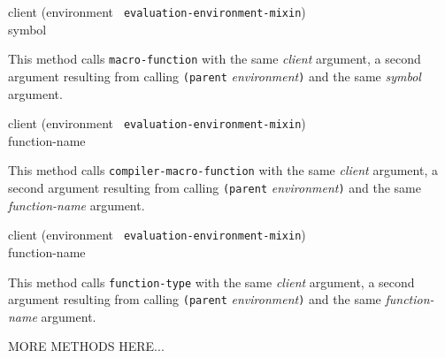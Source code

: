 {\small{} {client (environment {\tt
      evaluation-environment-mixin}) \\ symbol}
}

This method calls \texttt{macro-function} with the same
\textit{client} argument, a second argument resulting from calling
\texttt{(parent} \textit{environment}\texttt{)} and the same
\textit{symbol} argument.

{\small{} {client (environment {\tt
      evaluation-environment-mixin}) \\ function-name}
}

This method calls \texttt{compiler-macro-function} with the same
\textit{client} argument, a second argument resulting from calling
\texttt{(parent} \textit{environment}\texttt{)} and the same
  \textit{function-name} argument.

{\small{} {client (environment {\tt
      evaluation-environment-mixin}) \\ function-name}
}

This method calls \texttt{function-type} with the same \textit{client}
argument, a second argument resulting from calling \texttt{(parent}
\textit{environment}\texttt{)} and the same \textit{function-name}
argument.

MORE METHODS HERE...
